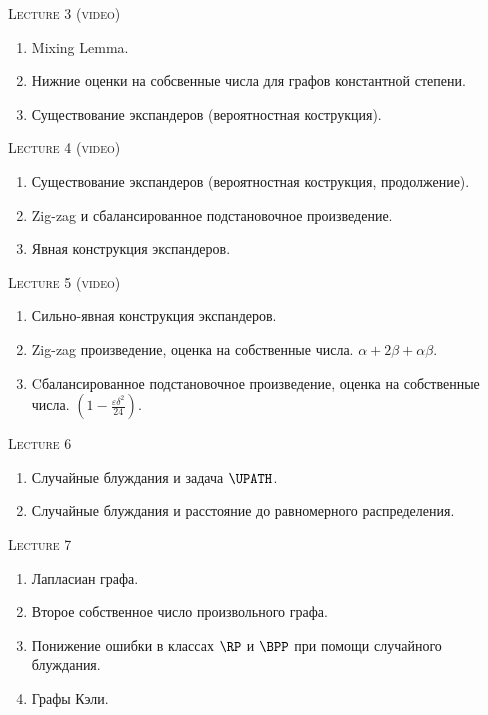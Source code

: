 \centerline{\textsc{Lecture 3 (video)}}

\begin{enumerate}
    \item Mixing Lemma.
    \item Нижние оценки на собсвенные числа для графов константной степени.
    \item Существование экспандеров (вероятностная кострукция).
\end{enumerate}

\centerline{\textsc{Lecture 4 (video)}}

\begin{enumerate}
    \item Существование экспандеров (вероятностная кострукция, продолжение).
    \item Zig-zag и сбалансированное подстановочное произведение.
    \item Явная конструкция экспандеров.
\end{enumerate}

\centerline{\textsc{Lecture 5 (video)}}

\begin{enumerate}
    \item Сильно-явная конструкция экспандеров.
    \item Zig-zag произведение, оценка на собственные числа. $\alpha + 2 \beta + \alpha \beta$.
    \item Cбалансированное подстановочное произведение, оценка на собственные числа. $\left(1 -
        \frac{\varepsilon \delta^2}{24}\right)$.
\end{enumerate}


\centerline{\textsc{Lecture 6}}

\begin{enumerate}
    \item Случайные блуждания и задача $\UPATH$.
    \item Случайные блуждания и расстояние до равномерного распределения.
\end{enumerate}

\centerline{\textsc{Lecture 7}}

\begin{enumerate}
    \item Лапласиан графа.
    \item Второе собственное число произвольного графа.
    \item Понижение ошибки в классах $\RP$ и $\BPP$ при помощи случайного блуждания.
    \item Графы Кэли.
\end{enumerate}


